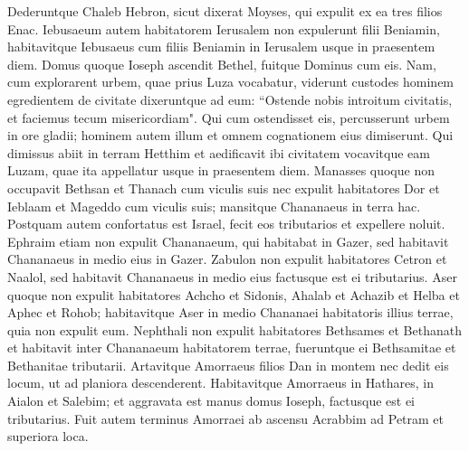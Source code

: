 \begin{biblechapter}
\verse Dederuntque Chaleb Hebron, sicut dixerat Moyses, qui expulit ex ea tres filios Enac. 
\verse Iebusaeum autem habitatorem Ierusalem non expulerunt filii Beniamin, habitavitque Iebusaeus cum filiis Beniamin in Ierusalem usque in praesentem diem. 
\verse Domus quoque Ioseph ascendit Bethel, fuitque Dominus cum eis. 
\verse Nam, cum explorarent urbem, quae prius Luza vocabatur, 
\verse viderunt custodes hominem egredientem de civitate dixeruntque ad eum: “Ostende nobis introitum civitatis, et faciemus tecum misericordiam". 
\verse Qui cum ostendisset eis, percusserunt urbem in ore gladii; hominem autem illum et omnem cognationem eius dimiserunt.  
\verse Qui dimissus abiit in terram Hetthim et aedificavit ibi civitatem vocavitque eam Luzam, quae ita appellatur usque in praesentem diem. 
\verse Manasses quoque non occupavit Bethsan et Thanach cum viculis suis nec expulit habitatores Dor et Ieblaam et Mageddo cum viculis suis; mansitque Chananaeus in terra hac. 
\verse Postquam autem confortatus est Israel, fecit eos tributarios et expellere noluit. 
\verse Ephraim etiam non expulit Chananaeum, qui habitabat in Gazer, sed habitavit Chananaeus in medio eius in Gazer. 
\verse Zabulon non expulit habitatores Cetron et Naalol, sed habitavit Chananaeus in medio eius factusque est ei tributarius. 
\verse Aser quoque non expulit habitatores Achcho et Sidonis, Ahalab et Achazib et Helba et Aphec et Rohob; 
\verse habitavitque Aser in medio Chananaei habitatoris illius terrae, quia non expulit eum. 
\verse Nephthali non expulit habitatores Bethsames et Bethanath et habitavit inter Chananaeum habitatorem terrae, fueruntque ei Bethsamitae et Bethanitae tributarii. 
\verse Artavitque Amorraeus filios Dan in montem nec dedit eis locum, ut ad planiora descenderent. 
\verse Habitavitque Amorraeus in Hathares, in Aialon et Salebim; et aggravata est manus domus Ioseph, factusque est ei tributarius. 
\verse Fuit autem terminus Amorraei ab ascensu Acrabbim ad Petram et superiora loca. 
\end{biblechapter}

